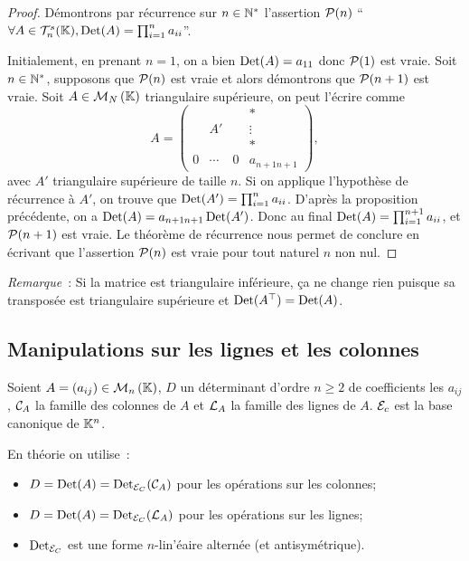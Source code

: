 \begin{proof}
  Démontrons par récurrence sur \(n \in \N^*\) l'assertion \(\P(n)\)
  ``\(\forall A \in \mathcal{T}_n^s(\K), \Det(A)=\prod_{i=1}^n a_{ii}\)''.

  Initialement, en prenant \(n=1\), on a bien \(\Det(A)=a_{11}\) donc
  \(\P(1)\) est vraie. Soit \(n \in \N^*\), supposons que \(\P(n)\) est
  vraie et alors démontrons que \(\P(n+1)\) est vraie. Soit \(A \in
  \Mn{N}{\K}\) triangulaire supérieure, on peut l'écrire comme
  \begin{equation}
    A =
    \begin{pmatrix}
      &        &  & *        \\
      & A'     &  & \vdots   \\
      &        &  & *        \\
      0 & \cdots &0 & a_{n+1 n+1}
    \end{pmatrix},
  \end{equation}
  avec \(A'\) triangulaire supérieure de taille \(n\). Si on applique
  l'hypothèse de récurrence à \(A'\), on trouve que
  \(\Det(A')=\prod_{i=1}^{n} a_{ii}\). D'après la proposition précédente,
  on a \(\Det(A)=a_{n+1 n+1} \Det(A')\). Donc au final
  \(\Det(A)=\prod_{i=1}^{n+1} a_{ii}\), et \(\P(n+1)\) est vraie. Le
  théorème de récurrence nous permet de conclure en écrivant que
  l'assertion \(\P(n)\) est vraie pour tout naturel \(n\) non nul.
\end{proof}

\emph{Remarque}~: Si la matrice est triangulaire inférieure, ça ne change
rien puisque sa transposée est triangulaire supérieure et \(\Det(A^{\top})
= \Det(A)\).

\subsection{Manipulations sur les lignes et les colonnes}

Soient \(A=(a_{ij})\in \Mn{n}{\K}\), \(D\) un déterminant d'ordre \(n
\geqslant 2\)  de coefficients les \(a_{ij}\), \(\courbe_A\) la famille
des colonnes de \(A\) et \(\Lb_A\) la famille des lignes de \(A\).
\(\E_c\) est la base canonique de \(\K^n\).

En théorie on utilise~:
\begin{itemize}
  \item \(D=\Det(A)=\Det_{\E_C}(\courbe_A)\) pour les opérations sur les
    colonnes;
  \item \(D=\Det(A)=\Det_{\E_C}(\Lb_A)\) pour les opérations sur les
    lignes;
  \item \(\Det_{\E_C}\) est une forme \(n\)-lin'éaire alternée (et
    antisymétrique).
\end{itemize}

